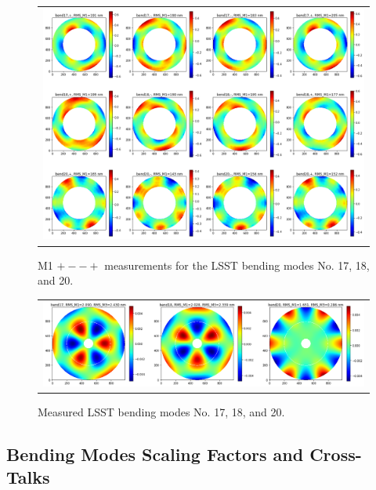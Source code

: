 \documentclass [twoside,openbib,12pt]{article}
\begin{document}
 \begin{figure}[bthp]
   \begin{center}
     \begin{tabular}{c}
\includegraphics[width=150mm]{figures/m1pmmp.png}
  \end{tabular}
   \end{center}
   \caption
   { \label{fig:m1pmmp}
     M1 $+--+$ measurements
 for the LSST bending modes No. 17, 18, and 20.
 }
\end{figure}

 \begin{figure}[bthp]
   \begin{center}
     \begin{tabular}{c}
\includegraphics[width=150mm]{figures/measuredBM.png}
  \end{tabular}
   \end{center}
   \caption
  { \label{fig:measuredBM}
Measured LSST bending modes No. 17, 18, and 20.
 }
\end{figure}

\subsection{Bending Modes Scaling Factors and Cross-Talks}
\label{sec:finalBM}
\end{document}
